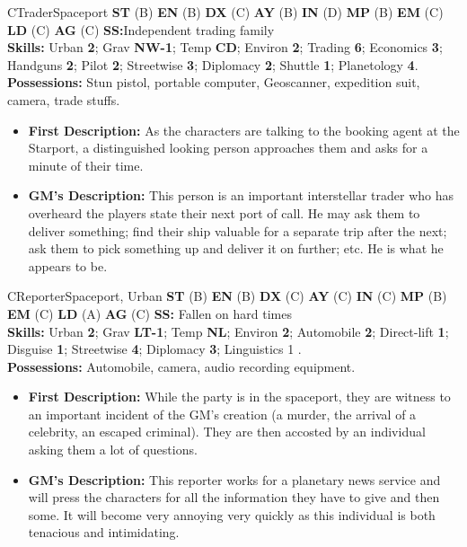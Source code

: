 \begin{npc}{C}{Trader}{Spaceport}
  \textbf{ST} (B) \textbf{EN} (B) \textbf{DX} (C) \textbf{AY} (B)
  \textbf{IN} (D) \textbf{MP} (B) \textbf{EM} (C) \textbf{LD} (C)
  \textbf{AG} (C) \textbf{SS:}Independent trading family \\ 
  \textbf{Skills:} Urban \textbf{2}; Grav \textbf{NW-1}; Temp
  \textbf{CD}; Environ \textbf{2}; Trading \textbf{6}; Economics
  \textbf{3}; Handguns \textbf{2}; Pilot \textbf{2}; Streetwise
  \textbf{3}; Diplomacy \textbf{2}; Shuttle \textbf{1};  
  Planetology \textbf{4}. \\ 
  \textbf{Possessions:} Stun pistol, portable computer, Geoscanner,
  expedition suit, camera, trade stuffs.  
  \begin{itemize}
  \item \textbf{First Description:} As the characters are talking to
    the booking agent at the Starport, a distinguished looking person
    approaches them and asks for a minute of their time.
  \item \textbf{GM's Description:} This person is an important
    interstellar trader who has overheard the players state their next
    port of call. He may ask them to deliver something; find their
    ship valuable for a separate trip after the next; ask them to pick
    something up and deliver it on further; etc. He is what he appears
    to be.
  \end{itemize}
\end{npc}

\hrulefill

\begin{npc}{C}{Reporter}{Spaceport, Urban}
  \textbf{ST} (B) \textbf{EN} (B) \textbf{DX} (C) \textbf{AY} (C)
  \textbf{IN} (C) \textbf{MP} (B) \textbf{EM} (C) \textbf{LD} (A)
  \textbf{AG} (C) \textbf{SS:} Fallen on hard times \\
  \textbf{Skills:} Urban \textbf{2}; Grav \textbf{LT-1}; Temp
  \textbf{NL}; Environ \textbf{2}; Automobile \textbf{2}; Direct-lift
  \textbf{1}; Disguise \textbf{1}; Streetwise \textbf{4}; Diplomacy
  \textbf{3}; Linguistics 1 . \\ 
  \textbf{Possessions:} Automobile, camera, audio recording
  equipment. 
  \begin{itemize}
  \item \textbf{First Description:} While the party is in the
    spaceport, they are witness to an important incident of the GM's
    creation (a murder, the arrival of a celebrity, an escaped
    criminal). They are then accosted by an individual asking them a
    lot of questions.
  \item \textbf{GM's Description:} This reporter works for a planetary
    news service and will press the characters for all the information
    they have to give and then some. It will become very annoying very
    quickly as this individual is both tenacious and intimidating.
\end{itemize}
\end{npc}


